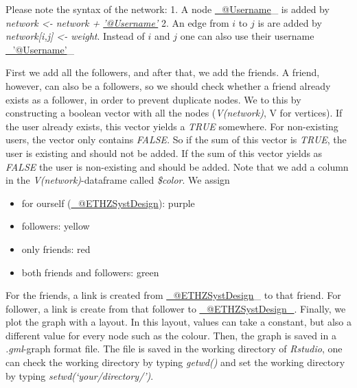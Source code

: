 \documentclass[]{article}
\begin{document}
Please note the syntax of the network: 1. A node
\href{mailto:_@Username}{\_@Username}\_ is added by \emph{network
\textless{}- network + \href{mailto:'@Username'}{'@Username'}} 2. An
edge from $i$ to $j$ is are added by \emph{network{[}i,j{]} \textless{}-
weight}. Instead of $i$ and $j$ one can also use their username
\href{mailto:_'@Username'}{\_'@Username'}\_

First we add all the followers, and after that, we add the friends. A
friend, however, can also be a followers, so we should check whether a
friend already exists as a follower, in order to prevent duplicate
nodes. We to this by constructing a boolean vector with all the nodes
(\emph{V(network)}, V for vertices). If the user already exists, this
vector yields a \emph{TRUE} somewhere. For non-existing users, the
vector only contains \emph{FALSE}. So if the sum of this vector is
\emph{TRUE}, the user is existing and should not be added. If the sum of
this vector yields as \emph{FALSE} the user is non-existing and should
be added. Note that we add a column in the \emph{V(network)}-dataframe
called \emph{\$color}. We assign

\begin{itemize}
\itemsep1pt\parskip0pt
\item
  for ourself (\href{mailto:_@ETHZSystDesign}{\_@ETHZSystDesign}):
  purple
\item
  followers: yellow
\item
  only friends: red
\item
  both friends and followers: green
\end{itemize}

For the friends, a link is created from
\href{mailto:_@ETHZSystDesign}{\_@ETHZSystDesign}\_ to that friend. For
follower, a link is create from that follower to
\href{mailto:_@ETHZSystDesign_}{\_@ETHZSystDesign\_}. Finally, we plot
the graph with a layout. In this layout, values can take a constant, but
also a different value for every node such as the colour. Then, the
graph is saved in a \emph{.gml}-graph format file. The file is saved in
the working directory of \emph{Rstudio}, one can check the working
directory by typing \emph{getwd()} and set the working directory by
typing \emph{setwd(`your/directory/')}.
\end{document}
